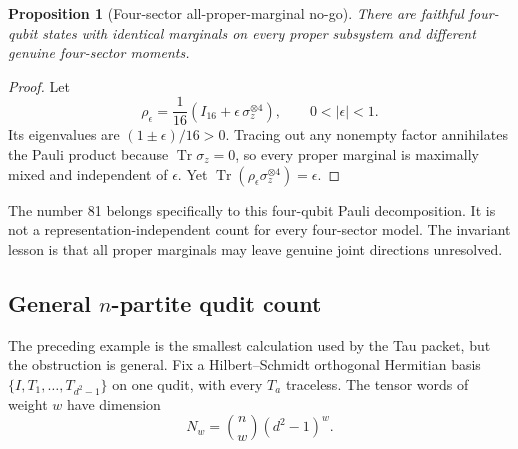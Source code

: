 \documentclass[11pt]{article}
\newtheorem{proposition}{Proposition}
\newcommand{\Tr}{\operatorname{Tr}}
\begin{document}
\begin{proposition}[Four-sector all-proper-marginal no-go]
There are faithful four-qubit states with identical marginals on every proper
subsystem and different genuine four-sector moments.
\end{proposition}
\begin{proof}
Let
\begin{equation}
 \rho_\epsilon=\frac{1}{16}
 \left(I_{16}+\epsilon\,\sigma_z^{\otimes4}\right),
 \qquad0<|\epsilon|<1.
 \label{eq:four-sector-family}
\end{equation}
Its eigenvalues are \((1\pm\epsilon)/16>0\).  Tracing out any nonempty factor
annihilates the Pauli product because \(\Tr\sigma_z=0\), so every proper
marginal is maximally mixed and independent of \(\epsilon\).  Yet
\(\Tr(\rho_\epsilon\sigma_z^{\otimes4})=\epsilon\).
\end{proof}

The number 81 belongs specifically to this four-qubit Pauli decomposition.
It is not a representation-independent count for every four-sector model.
The invariant lesson is that all proper marginals may leave genuine joint
directions unresolved.

\subsection{General \texorpdfstring{\(n\)}{n}-partite qudit count}

The preceding example is the smallest calculation used by the Tau packet, but
the obstruction is general.  Fix a Hilbert--Schmidt orthogonal Hermitian basis
\(\{I,T_1,\ldots,T_{d^2-1}\}\) on one qudit, with every \(T_a\) traceless.
The tensor words of weight \(w\) have dimension
\begin{equation}
 N_w=\binom{n}{w}(d^2-1)^w.
 \label{eq:weight-count}
\end{equation}
\end{document}
